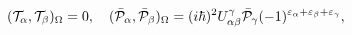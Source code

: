 \begin{equation}\label{5.6}
({\cal T}_\alpha,{\cal T}_\beta)_\Omega=0,\quad
(\bar{\cal P}_\alpha,\bar{\cal P}_\beta)_\Omega=(i\hbar)^2
U^\gamma_{\alpha\beta}\bar{\cal P}_\gamma
(-1)^{\varepsilon_\alpha+\varepsilon_\beta+\varepsilon_\gamma},
\end{equation}

